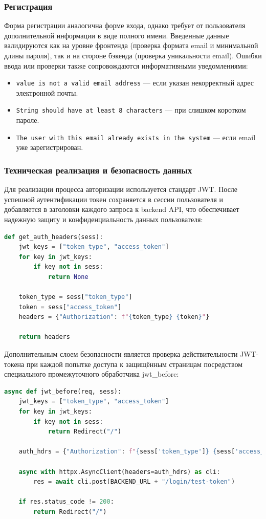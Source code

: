 \subsubsection{Регистрация}

Форма регистрации аналогична форме входа, однако требует от пользователя дополнительной информации 
в виде полного имени. Введенные данные валидируются как на уровне фронтенда (проверка 
формата email и минимальной длины пароля), так и на стороне бэкенда (проверка уникальности email). 
Ошибки ввода или проверки также сопровождаются информативными уведомлениями:

\begin{itemize}
  \item \texttt{value is not a valid email address} — если указан некорректный адрес электронной почты.
  \item \texttt{String should have at least 8 characters} — при слишком коротком пароле.
  \item \texttt{The user with this email already exists in the system} — если email уже зарегистрирован.
\end{itemize}

\subsubsection{Техническая реализация и безопасность данных}

Для реализации процесса авторизации используется стандарт JWT. После успешной 
аутентификации токен сохраняется в сессии пользователя и добавляется в заголовки каждого запроса 
к backend API, что обеспечивает надежную защиту и конфиденциальность данных пользователя:

\begin{lstlisting}[language=Python, numbers=none, frame=none]
def get_auth_headers(sess):
    jwt_keys = ["token_type", "access_token"]
    for key in jwt_keys:
        if key not in sess:
            return None

    token_type = sess["token_type"]
    token = sess["access_token"]
    headers = {"Authorization": f"{token_type} {token}"}

    return headers
\end{lstlisting}

Дополнительным слоем безопасности является проверка действительности JWT-токена при каждой попытке 
доступа к защищённым страницам посредством специального промежуточного обработчика 
jwt\_before:

\begin{lstlisting}[language=Python, numbers=none, frame=none]
async def jwt_before(req, sess):
    jwt_keys = ["token_type", "access_token"]
    for key in jwt_keys:
        if key not in sess:
            return Redirect("/")

    auth_hdrs = {"Authorization": f"{sess['token_type']} {sess['access_token']}"}

    async with httpx.AsyncClient(headers=auth_hdrs) as cli:
        res = await cli.post(BACKEND_URL + "/login/test-token")

    if res.status_code != 200:
        return Redirect("/")
\end{lstlisting}

